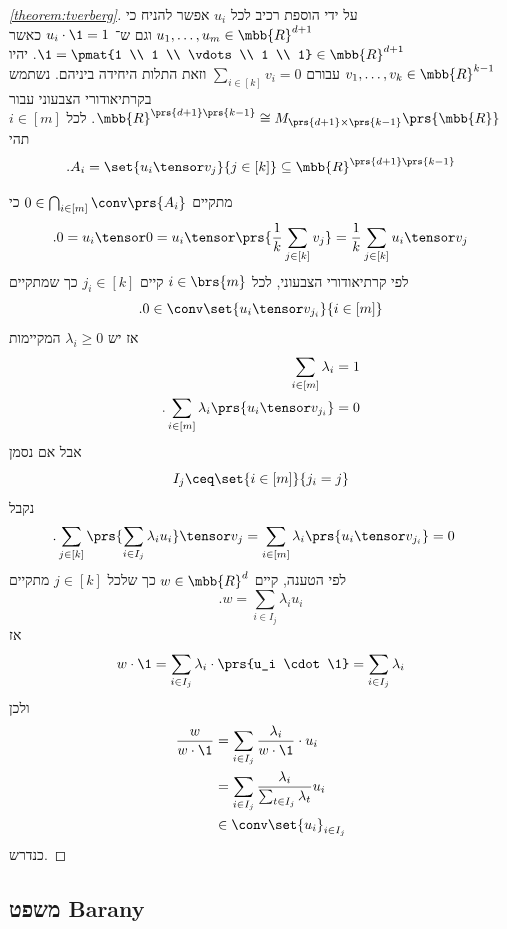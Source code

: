\documentclass[a4paper,10pt,twoside,openany]{book}
\begin{document}
\begin{proof}[\ref{theorem:tverberg}]
על ידי הוספת רכיב לכל
$u_i$
אפשר להניח כי
$u_1, \ldots, u_m \in \mbb{R}^{d+1}$
וגם ש־%
$u_i \cdot \1 = 1$
כאשר
$\1 = \pmat{1 \\ 1 \\ \vdots \\ 1 \\ 1} \in \mbb{R}^{d+1}$.
יהיו
$v_1, \ldots, v_k \in \mbb{R}^{k-1}$
עבורם
$\sum_{i \in [k]} v_i = 0$
וזאת התלות היחידה ביניהם.
נשתמש בקרתיאודורי הצבעוני עבור
$\mbb{R}^{\prs{d+1}\prs{k-1}} \cong M_{\prs{d+1} \times \prs{k-1}}\prs{\mbb{R}}$.
לכל
$i \in [m]$
תהי
\[\text{.} A_i = \set{u_i \tensor v_j}{j \in [k]} \subseteq \mbb{R}^{\prs{d+1}\prs{k-1}}\]

מתקיים
$0 \in \bigcap_{i \in [m]} \conv\prs{A_i}$
כי
\[\text{.} 0 = u_i \tensor 0 = u_i \tensor \prs{\frac{1}{k} \sum_{j \in [k]} v_j} = \frac{1}{k} \sum_{j \in [k]} u_i \tensor v_j\]
לפי קרתיאודורי הצבעוני, לכל
$i \in \brs{m}$
קיים
$j_i \in [k]$
כך שמתקיים
\[\text{.} 0 \in \conv\set{u_i \tensor v_{j_i}}{i \in [m]}\]
אז יש
$\lambda_i \geq 0$
המקיימות
\begin{align*}
\sum_{i \in [m]} \lambda_i &= 1 \\
\text{.} \sum_{i \in [m]} \lambda_i \prs{u_i \tensor v_{j_i}} &= 0
\end{align*}
אבל אם נסמן
\[I_j \ceq \set{i \in [m]}{j_i = j}\]
נקבל
\begin{align*}
\text{.}  \sum_{j \in [k]} \prs{\sum_{i \in I_j} \lambda_i u_i} \tensor v_j &= \sum_{i \in [m]} \lambda_i \prs{u_i \tensor v_{j_i}} = 0
\end{align*}
לפי הטענה, קיים
$w \in \mbb{R}^d$
כך שלכל
$j \in [k]$
מתקיים
\[\text{.} w = \sum_{i \in I_j} \lambda_i u_i\]
אז
\[w \cdot \1 = \sum_{i \in I_j} \lambda_i \cdot \prs{u_i \cdot \1} = \sum_{i \in I_j} \lambda_i\]
ולכן
\begin{align*}
\frac{w}{w \cdot \1} &= \sum_{i \in I_j} \frac{\lambda_i}{w \cdot \1} \cdot u_i
\\&= \sum_{i \in I_j} \frac{\lambda_i}{\sum_{t \in I_j} \lambda_t} u_i
\\&\in \conv\set{u_i}_{i \in I_j}
\end{align*}
כנדרש.
\end{proof}

\subsection{משפט
\textenglish{Barany}}
\end{document}
